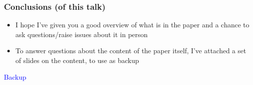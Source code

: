 \documentclass[compress]{beamer}
\begin{document}

\begin{frame}
\frametitle{Conclusions (of this talk)}

\begin{itemize}\setlength{\itemsep}{0.25 cm}
\item I hope I've given you a good overview of what is in the paper and a chance to ask questions/raise issues about it in person

\item To answer questions about the content of the paper itself, I've attached a set of slides on the content, to use as backup

\end{itemize}
\label{numpages}
\end{frame}

\begin{frame}
\begin{center}
\Huge \textcolor{blue}{Backup}
\end{center}
\end{frame}
\end{document}

